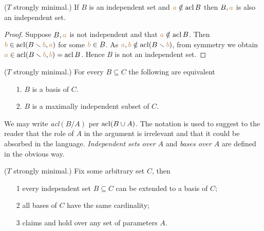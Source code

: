 \begin{lemma}\label{indipendenza+1}
($T$ strongly minimal.) If $B$ is an independent set and ${\color{brown} a}\notin \mathop{\rm acl} B$ then $B,{\color{brown} a}$ is also an independent set.
\end{lemma}
\begin{proof}
Suppose $B,{\color{brown} a}$ is not independent and that ${\color{brown} a}\notin \mathop{\rm acl} B$.
Then ${\color{brown} b}\in\mathop{\rm acl}(B\smallsetminus {\color{brown}b},{\color{brown} a})$ for some ${\color{brown} b}\in B$.
As ${\color{brown} a},{\color{brown} b}\notin\mathop{\rm acl}(B\smallsetminus {\color{brown}b})$, from symmetry we obtain ${\color{brown} a}\in\mathop{\rm acl}(B\smallsetminus {\color{brown}b},{\color{brown} b})=\mathop{\rm acl} B$.
Hence $B$ is not an independent set.
\end{proof}

\begin{corollary}\label{basemassimale}
($T$ strongly minimal.) For every $B\subseteq C$ the following are equivalent
\begin{itemize}
\item[1.] $B$ is a basis of $C$.
\item[2.] $B$ is a maximally independent subset of $C$.\QED
\end{itemize}
\end{corollary}

We may write \emph{acl$(B/A)$\/} per $\mathop{\rm acl}(B\cup A)$.
The notation is used to suggest to the reader that the role of $A$ in the argument is irrelevant and that it could be absorbed in the language.
\emph{Independent sets over $A$\/} and \emph{bases over $A$\/} are defined in the obvious way.

\begin{theorem} ($T$ strongly minimal.) Fix some arbitrary set $C$, then
\begin{itemize}
\item[1] every independent set $B\subseteq C$ can be extended to a basis of $C$;
\item[2] all bases of $C$ have the same cardinality;
\item[3] claims  and  hold over any set of parameters $A$.
\end{itemize}
\end{theorem}

